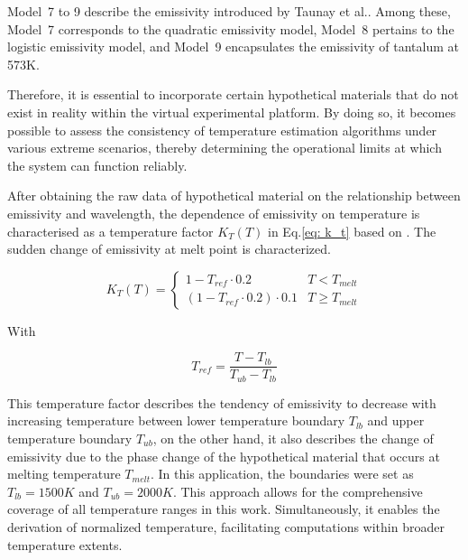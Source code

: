 \mbox{Model 7} to 9 describe the emissivity introduced by Taunay et al.\cite{Taunay.2020b}.
Among these, \mbox{Model 7} corresponds to the quadratic emissivity model, \mbox{Model 8} pertains 
to the logistic emissivity model, 
and \mbox{Model 9} encapsulates the emissivity of tantalum at 573K.


Therefore, it is essential to incorporate certain hypothetical materials 
that do not exist in reality within the virtual experimental platform. 
By doing so, it becomes possible to assess the consistency of temperature 
estimation algorithms under various extreme scenarios, thereby determining 
the operational limits at which the system can function reliably.


After obtaining the raw data of hypothetical material on the relationship between emissivity 
and wavelength, the dependence of emissivity on temperature is characterised
as a temperature factor $K_T(T)$ in Eq.\ref{eq: k_t} based on \cite{Chen.2023}. 
The sudden change of emissivity at melt point is characterized.

\begin{equation}
  \label{eq: k_t}
  K_T(T)=\begin{cases}
    1 - T_{ref} \cdot 0.2 &   T<T_{melt}\\
    \left(1 - T_{ref} \cdot 0.2 \right) \cdot 0.1 &  T\geq T_{melt}
  \end{cases}
\end{equation}


With 

\begin{equation}
  \label{eq: t_ref}
  T_{ref}=\frac{T - T_{lb}}{T_{ub} - T_{lb}}
\end{equation}


This temperature factor describes the tendency 
of emissivity to decrease with increasing temperature between lower temperature boundary $T_{lb}$ 
and upper temperature boundary $T_{ub}$, 
on the other hand, it also describes the change of emissivity due to the 
phase change of the hypothetical material that occurs at melting 
temperature $T_{melt}$. In this application, the boundaries were set as $T_{lb} = 1500K$ and $T_{ub} = 2000K$.
This approach allows for the comprehensive coverage of all temperature ranges in this work. 
Simultaneously, it enables the derivation of normalized temperature, facilitating computations 
within broader temperature extents.


